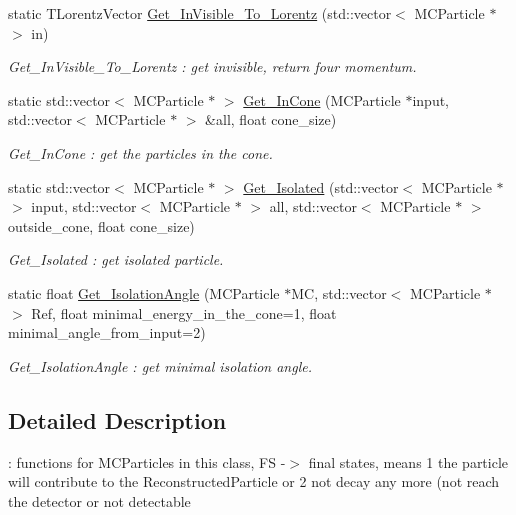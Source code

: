 \begin{DoxyCompactItemize}
static TLorentzVector \hyperlink{classToolSet_1_1CMC_ab44cceb872950622551735a97a23bd4d}{Get\_\-InVisible\_\-To\_\-Lorentz} (std::vector$<$ MCParticle $\ast$ $>$ in)
\begin{DoxyCompactList}\small\item\em Get\_\-InVisible\_\-To\_\-Lorentz : get invisible, return four momentum. \item\end{DoxyCompactList}\item 
static std::vector$<$ MCParticle $\ast$ $>$ \hyperlink{classToolSet_1_1CMC_a721fbac55172fef2776b1637d55de936}{Get\_\-InCone} (MCParticle $\ast$input, std::vector$<$ MCParticle $\ast$ $>$ \&all, float cone\_\-size)
\begin{DoxyCompactList}\small\item\em Get\_\-InCone : get the particles in the cone. \item\end{DoxyCompactList}\item 
static std::vector$<$ MCParticle $\ast$ $>$ \hyperlink{classToolSet_1_1CMC_a21929017024c827e522e120616bd6bed}{Get\_\-Isolated} (std::vector$<$ MCParticle $\ast$ $>$ input, std::vector$<$ MCParticle $\ast$ $>$ all, std::vector$<$ MCParticle $\ast$ $>$ outside\_\-cone, float cone\_\-size)
\begin{DoxyCompactList}\small\item\em Get\_\-Isolated : get isolated particle. \item\end{DoxyCompactList}\item 
static float \hyperlink{classToolSet_1_1CMC_a507837bc0dd0238a8b44f0855e647b0c}{Get\_\-IsolationAngle} (MCParticle $\ast$MC, std::vector$<$ MCParticle $\ast$ $>$ Ref, float minimal\_\-energy\_\-in\_\-the\_\-cone=1, float minimal\_\-angle\_\-from\_\-input=2)
\begin{DoxyCompactList}\small\item\em Get\_\-IsolationAngle : get minimal isolation angle. \item\end{DoxyCompactList}\end{DoxyCompactItemize}


\subsection{Detailed Description}
: functions for MCParticles in this class, FS -\/$>$ final states, means 1 the particle will contribute to the ReconstructedParticle or 2 not decay any more (not reach the detector or not detectable

